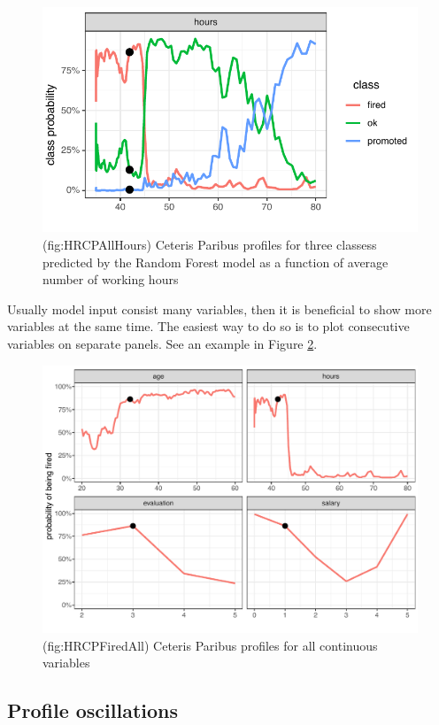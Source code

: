 \documentclass[]{krantz}
\theoremstyle{definition}
\theoremstyle{definition}
\theoremstyle{definition}
\theoremstyle{remark}
\begin{document}
\begin{figure}

{\centering \includegraphics[width=0.6\linewidth]{figure/HR_cp_all_hours} 

}

\caption{(fig:HRCPAllHours) Ceteris Paribus profiles for three classess predicted by the Random Forest model as a function of average number of working hours}\label{fig:HRCPAllHours}
\end{figure}

Usually model input consist many variables, then it is beneficial to
show more variables at the same time. The easiest way to do so is to
plot consecutive variables on separate panels. See an example in Figure
\ref{fig:HRCPFiredAll}.

\begin{figure}

{\centering \includegraphics[width=0.7\linewidth]{figure/HR_cp_fired_all} 

}

\caption{(fig:HRCPFiredAll) Ceteris Paribus profiles for all continuous variables}\label{fig:HRCPFiredAll}
\end{figure}

\hypertarget{oscillations}{%
\subsection{Profile oscillations}\label{oscillations}}
\end{document}
